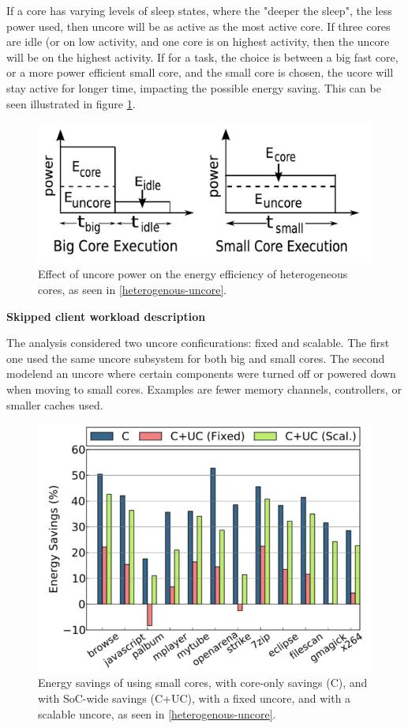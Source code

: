 If a core has varying levels of sleep states, where the "deeper the sleep", the less power used, then uncore will be as active as the most active core.
If three cores are idle (or on low activity, and one core is on highest activity, then the uncore will be on the highest activity.
If for a task, the choice is between a big fast core, or a more power efficient small core, and the small core is chosen, the ucore will stay active for longer time, impacting the possible energy saving.
This can be seen illustrated in figure \ref{fig:Uncore1}.

\begin{figure}[htb]
    \centering
    \includegraphics[width=1.0\textwidth]{Figures/Heterogeneous/Uncore1}
    \caption{Effect of uncore power on the energy efficiency of heterogeneous cores, as seen in \ref{heterogenous-uncore}.}
    \label{fig:Uncore1}
\end{figure}


\textbf{Skipped client workload description}

The analysis considered two uncore conficurations: fixed and scalable.
The first one used the same uncore subsystem for both big and small cores.
The second modelend an uncore where certain components were turned off or powered down when moving to small cores.
Examples are fewer memory channels, controllers, or smaller caches used.  

\begin{figure}[htb]
    \centering
    \includegraphics[width=1.0\textwidth]{Figures/Heterogeneous/Uncore2}
    \caption{Energy savings of using small cores, with core-only savings (C), and with SoC-wide savings (C+UC), with a fixed uncore, and with a scalable uncore, as seen in \ref{heterogenous-uncore}.}
    \label{fig:Uncore2}
\end{figure}

